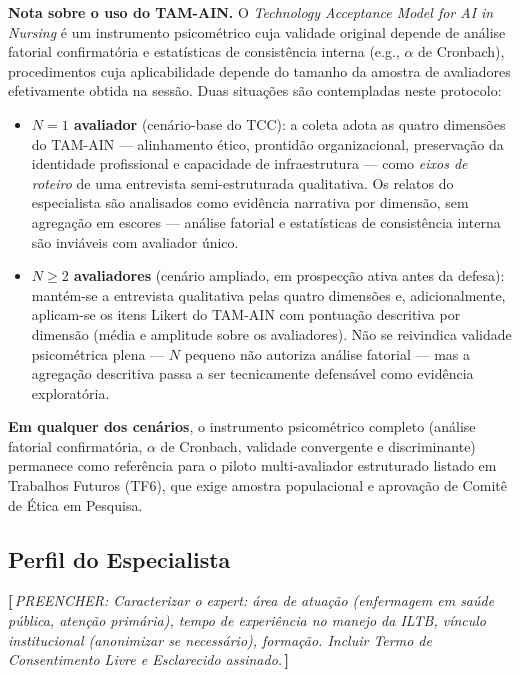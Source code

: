 \documentclass[
  12pt,
  oneside,
  a4paper,
  english,
  brazil
]{abntex2}
\newcommand{\aluno}[1]{{\color{olive!80!black}\textbf{[\,}{\small\itshape PREENCHER: #1}\textbf{\,]}}}
\begin{document}
\textbf{Nota sobre o uso do TAM-AIN.} O \textit{Technology Acceptance Model for AI
in Nursing} \cite{nursingTAM2024} é um instrumento psicométrico cuja validade
original depende de análise fatorial confirmatória e estatísticas de
consistência interna (e.g., $\alpha$ de Cronbach), procedimentos cuja
aplicabilidade depende do tamanho da amostra de avaliadores efetivamente
obtida na sessão. Duas situações são contempladas neste protocolo:

\begin{itemize}
  \item \textbf{$N=1$ avaliador} (cenário-base do TCC): a coleta adota as
        quatro dimensões do TAM-AIN --- alinhamento ético, prontidão
        organizacional, preservação da identidade profissional e
        capacidade de infraestrutura --- como \emph{eixos de roteiro} de
        uma entrevista semi-estruturada qualitativa. Os relatos do
        especialista são analisados como evidência narrativa por dimensão,
        sem agregação em escores --- análise fatorial e estatísticas de
        consistência interna são inviáveis com avaliador único.
  \item \textbf{$N \geq 2$ avaliadores} (cenário ampliado, em prospecção
        ativa antes da defesa): mantém-se a entrevista qualitativa pelas
        quatro dimensões e, adicionalmente, aplicam-se os itens Likert do
        TAM-AIN com pontuação descritiva por dimensão (média e amplitude
        sobre os avaliadores). Não se reivindica validade psicométrica
        plena --- $N$ pequeno não autoriza análise fatorial --- mas a
        agregação descritiva passa a ser tecnicamente defensável como
        evidência exploratória.
\end{itemize}

\textbf{Em qualquer dos cenários}, o instrumento psicométrico completo
(análise fatorial confirmatória, $\alpha$ de Cronbach, validade convergente
e discriminante) permanece como referência para o piloto multi-avaliador
estruturado listado em Trabalhos Futuros (TF6), que exige amostra
populacional e aprovação de Comitê de Ética em Pesquisa.

\subsection{Perfil do Especialista}

\aluno{Caracterizar o expert: área de atuação (enfermagem em saúde pública, atenção
primária), tempo de experiência no manejo da ILTB, vínculo institucional (anonimizar
se necessário), formação. Incluir Termo de Consentimento Livre e Esclarecido
assinado.}
\end{document}
